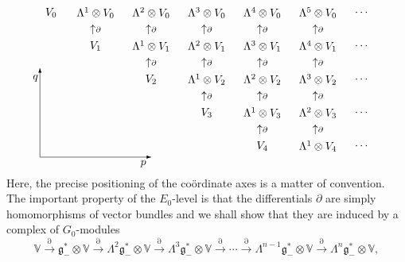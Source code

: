 \documentclass[11pt]{article}
\begin{document}
\begin{equation}\label{E0}\raisebox{-70pt}{\begin{picture}(300,148)(0,10)
\put(0,20){\vector(1,0){100}}
\put(0,20){\vector(0,1){80}}
\put(93,14){\makebox(0,0){$p$}}
\put(-4,91){\makebox(0,0){$q$}}
\put(10,150){\makebox(0,0){$V_0$}}
\put(50,150){\makebox(0,0){$\Lambda^1\otimes V_0$}}
\put(100,150){\makebox(0,0){$\Lambda^2\otimes V_0$}}
\put(150,150){\makebox(0,0){$\Lambda^3\otimes V_0$}}
\put(200,150){\makebox(0,0){$\Lambda^4\otimes V_0$}}
\put(250,150){\makebox(0,0){$\Lambda^5\otimes V_0$}}
\put(290,150){\makebox(0,0){$\cdots$}}
\put(290,120){\makebox(0,0){$\cdots$}}
\put(290,90){\makebox(0,0){$\cdots$}}
\put(290,60){\makebox(0,0){$\cdots$}}
\put(290,30){\makebox(0,0){$\cdots$}}
\put(50,135){\makebox(0,0){$\uparrow\scriptstyle\partial$}}
\put(100,135){\makebox(0,0){$\uparrow\scriptstyle\partial$}}
\put(150,135){\makebox(0,0){$\uparrow\scriptstyle\partial$}}
\put(200,135){\makebox(0,0){$\uparrow\scriptstyle\partial$}}
\put(250,135){\makebox(0,0){$\uparrow\scriptstyle\partial$}}
\put(50,120){\makebox(0,0){$V_1$}}
\put(100,120){\makebox(0,0){$\Lambda^1\otimes V_1$}}
\put(150,120){\makebox(0,0){$\Lambda^2\otimes V_1$}}
\put(200,120){\makebox(0,0){$\Lambda^3\otimes V_1$}}
\put(250,120){\makebox(0,0){$\Lambda^4\otimes V_1$}}
\put(100,105){\makebox(0,0){$\uparrow\scriptstyle\partial$}}
\put(150,105){\makebox(0,0){$\uparrow\scriptstyle\partial$}}
\put(200,105){\makebox(0,0){$\uparrow\scriptstyle\partial$}}
\put(250,105){\makebox(0,0){$\uparrow\scriptstyle\partial$}}
\put(100,90){\makebox(0,0){$V_2$}}
\put(150,90){\makebox(0,0){$\Lambda^1\otimes V_2$}}
\put(200,90){\makebox(0,0){$\Lambda^2\otimes V_2$}}
\put(250,90){\makebox(0,0){$\Lambda^3\otimes V_2$}}
\put(150,75){\makebox(0,0){$\uparrow\scriptstyle\partial$}}
\put(200,75){\makebox(0,0){$\uparrow\scriptstyle\partial$}}
\put(250,75){\makebox(0,0){$\uparrow\scriptstyle\partial$}}
\put(150,60){\makebox(0,0){$V_3$}}
\put(200,60){\makebox(0,0){$\Lambda^1\otimes V_3$}}
\put(250,60){\makebox(0,0){$\Lambda^2\otimes V_3$}}
\put(200,45){\makebox(0,0){$\uparrow\scriptstyle\partial$}}
\put(250,45){\makebox(0,0){$\uparrow\scriptstyle\partial$}}
\put(200,30){\makebox(0,0){$V_4$}}
\put(250,30){\makebox(0,0){$\Lambda^1\otimes V_4$}}
\end{picture}}\end{equation}
Here, the precise positioning of the co\"ordinate axes is a matter of
convention. The important property of the $E_0$-level is that the
dif\/ferentials $\partial$ are simply homomorphisms of vector bundles and we
shall show that they are induced by a complex of $G_0$-modules
\[{\mathbb{V}}\stackrel{\partial}{\longrightarrow}
{\mathfrak{g}}_-^*\otimes{\mathbb{V}}\stackrel{\partial}{\longrightarrow}
\Lambda^2{\mathfrak{g}}_-^*\otimes{\mathbb{V}}
\stackrel{\partial}{\longrightarrow}
\Lambda^3{\mathfrak{g}}_-^*\otimes{\mathbb{V}}
\stackrel{\partial}{\longrightarrow}\cdots\stackrel{\partial}{\longrightarrow}
\Lambda^{n-1}{\mathfrak{g}}_-^*\otimes{\mathbb{V}}
\stackrel{\partial}{\longrightarrow}
\Lambda^n{\mathfrak{g}}_-^*\otimes{\mathbb{V}},\]
\newpage
\end{document}
